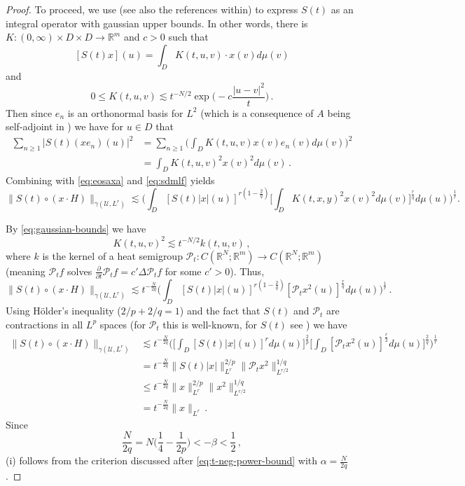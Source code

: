 \documentclass[final]{amsart}
\numberwithin{thm}{section}
\numberwithin{equation}{section}
\newcommand{\U}{\mathcal{U}}
\newcommand{\Pp}{\mathcal{P}}
\newcommand{\R}{\mathbb{R}}
\begin{document}
\begin{proof}
To proceed, we use \cite[(2.7),(2.8)]{Cerrai2003} (see also the references within) to express $S(t)$ as an integral operator with gaussian upper bounds. In other words, there is $K: (0,\infty) \times D \times D \to \R^m$ and $c > 0$ such that
$$[S(t)x](u) = \int_D K(t,u,v) \cdot x(v)d\mu(v)$$
and
\begin{equation}\label{eq:gaussian-bounds}
    0 \leq K(t,u,v) \lesssim t^{-N/2}\exp\Big(-c\frac{|u-v|^2}{t}\Big) \,.
\end{equation}
Then since $e_n$ is an orthonormal basis for $L^2$ (which is a consequence of $A$ being self-adjoint in ) we have for $u \in D$ that
\begin{align*}
\sum_{n \geq 1}|S(t)(xe_n)(u)|^2 &= \sum_{n \geq 1} \Big(\int_D K(t,u,v)x(v)e_n(v)d\mu(v)\Big)^2 
\\
&= \int_D K(t,u,v)^2x(v)^2d\mu(v) \,.
\end{align*}
Combining with \eqref{eq:eosaxa} and \eqref{eq:sdmlf} yields
$$
\|S(t) \circ (x \cdot H)\|_{\gamma(\U,L^r)} \lesssim \Big(\int_D [S(t)|x|(u)]^{r(1-\frac{2}{q})}\Big[\int_D K(t,x,y)^2x(v)^2d\mu(v)\Big]^{\frac{r}{q}}d\mu(u)\Big)^{\frac{1}{r}}.$$

By \eqref{eq:gaussian-bounds} we have
$$
K(t,u,v)^2 \lesssim t^{-N/2}k(t,u,v) \,,
$$
where $k$ is the kernel of a heat semigroup $\Pp_t: C(\R^N;\R^m) \to C(\R^N;\R^m)$ (meaning $\Pp_t f$ solves $\frac{\partial}{\partial t}\Pp_t f = c'\Delta \Pp_tf$ for some $c' > 0$). Thus,
$$
\|S(t) \circ (x \cdot H)\|_{\gamma(\U,L^r)} \lesssim t^{-\frac{N}{2q}}\Big(\int_D [S(t)|x|(u)]^{r(1-\frac{2}{q})}[\Pp_t x^2(u)]^{\frac{r}{q}}d\mu(u)\Big)^{\frac{1}{r}} \,.
$$
Using H\"{o}lder's inequality ($2/p + 2/q = 1$) and the fact that $S(t)$ and $\Pp_t$ are contractions in all $L^p$ spaces (for $\Pp_t$ this is well-known, for $S(t)$ see ) we have
\begin{align*}
    \|S(t) \circ (x \cdot H)\|_{\gamma(\U,L^r)} &\lesssim t^{-\frac{N}{2q}}\Big(\Big[\int_D [S(t)|x|(u)]^{r}d\mu(u)\Big]^{\frac{2}{p}}\Big[\int_D[\Pp_t x^2(u)]^{\frac{r}{2}}d\mu(u)\Big]^{\frac{2}{q}}\Big)^{\frac{1}{r}} \\
    &= t^{-\frac{N}{2q}}\|S(t)|x|\|_{L^r}^{2/p}\|\Pp_tx^2\|_{L^{r/2}}^{1/q} \\
    &\leq t^{-\frac{N}{2q}}\|x\|_{L^r}^{2/p}\|x^2\|_{L^{r/2}}^{1/q}\\
    &= t^{-\frac{N}{2q}}\|x\|_{L^r} \,.
\end{align*}
Since
\begin{equation}\label{eq:q-bigger-than-n}
    \frac{N}{2q} = N\Big(\frac{1}{4} - \frac{1}{2p}\Big) < 
    -\beta
    < \frac{1}{2} \,,
\end{equation}
(i) follows from the criterion discussed after \eqref{eq:t-neg-power-bound} with $\alpha = \frac{N}{2q}$.


\end{proof}
\end{document}
